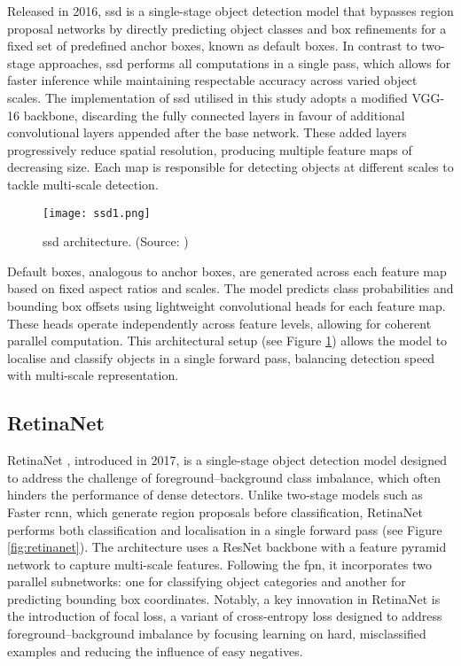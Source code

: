 Released in 2016, \gls{ssd} \cite{ssd} is a single-stage object detection model that bypasses region proposal networks by directly predicting object classes and box refinements for a fixed set of predefined anchor boxes, known as default boxes. In contrast to two-stage approaches, \gls{ssd} performs all computations in a single pass, which allows for faster inference while maintaining respectable accuracy across varied object scales.
The implementation of \gls{ssd} utilised in this study adopts a modified VGG-16 backbone, discarding the fully connected layers in favour of additional convolutional layers appended after the base network. These added layers progressively reduce spatial resolution, producing multiple feature maps of decreasing size. Each map is responsible for detecting objects at different scales to tackle multi-scale detection.

\begin{figure}[!htbp]
    \centering
    \texttt{[image: ssd1.png]}
    \caption{\gls{ssd} architecture. (Source: \cite{ssd})}
    \label{fig:ssd}
\end{figure}

Default boxes, analogous to anchor boxes, are generated across each feature map based on fixed aspect ratios and scales. The model predicts class probabilities and bounding box offsets using lightweight convolutional heads for each feature map. These heads operate independently across feature levels, allowing for coherent parallel computation. This architectural setup (see Figure \ref{fig:ssd}) allows the model to localise and classify objects in a single forward pass, balancing detection speed with multi-scale representation.

\subsection{RetinaNet}
\label{subsec:4_retinanet}

RetinaNet \cite{retinanet}, introduced in 2017, is a single-stage object detection model designed to address the challenge of foreground–background class imbalance, which often hinders the performance of dense detectors. Unlike two-stage models such as Faster \gls{rcnn}, which generate region proposals before classification, RetinaNet performs both classification and localisation in a single forward pass (see Figure \ref{fig:retinanet}).
The architecture uses a ResNet backbone with a feature pyramid network to capture multi-scale features. Following the \gls{fpn}, it incorporates two parallel subnetworks: one for classifying object categories and another for predicting bounding box coordinates. Notably, a key innovation in RetinaNet is the introduction of focal loss, a variant of cross-entropy loss designed to address foreground–background imbalance by focusing learning on hard, misclassified examples and reducing the influence of easy negatives.

